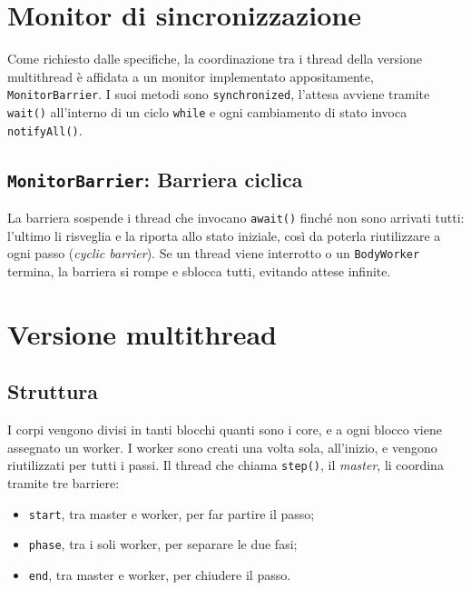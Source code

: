 \section{Monitor di sincronizzazione}
\label{sec:monitor}
Come richiesto dalle specifiche, la coordinazione tra i thread della versione multithread è affidata a un monitor implementato appositamente, \texttt{MonitorBarrier}.
I suoi metodi sono \texttt{synchronized}, l'attesa avviene tramite \texttt{wait()} all'interno di un ciclo \texttt{while} e ogni cambiamento di stato invoca \texttt{notifyAll()}.

\subsection{\texttt{MonitorBarrier}: Barriera ciclica}
\label{subsec:barrier}
La barriera sospende i thread che invocano \texttt{await()} finché non sono arrivati tutti: l'ultimo li risveglia e la riporta allo stato iniziale, così da poterla riutilizzare a ogni passo (\emph{cyclic barrier}).
Se un thread viene interrotto o un \texttt{BodyWorker} termina, la barriera si rompe e sblocca tutti, evitando attese infinite.

%
%
\section{Versione multithread}
\label{sec:design_thread}

\subsection{Struttura}
I corpi vengono divisi in tanti blocchi quanti sono i core, e a ogni blocco viene assegnato un worker.
I worker sono creati una volta sola, all'inizio, e vengono riutilizzati per tutti i passi.
Il thread che chiama \texttt{step()}, il \emph{master}, li coordina tramite tre barriere:
\begin{itemize}
  \item \texttt{start}, tra master e worker, per far partire il passo;
  \item \texttt{phase}, tra i soli worker, per separare le due fasi;
  \item \texttt{end}, tra master e worker, per chiudere il passo.
\end{itemize}

